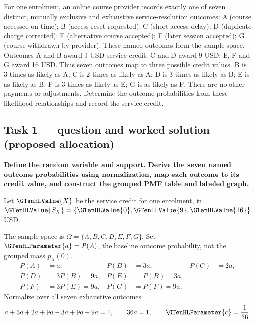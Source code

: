 For one enrolment, an online course provider records exactly one of seven distinct, mutually exclusive and exhaustive service-resolution outcomes: A (course accessed on time); B (access reset requested); C (short access delay); D (duplicate charge corrected); E (alternative course accepted); F (later session accepted); G (course withdrawn by provider). These named outcomes form the sample space. Outcomes A and B award 0 USD service credit; C and D award 9 USD; E, F and G award 16 USD. Thus seven outcomes map to three possible credit values. B is 3 times as likely as A; C is 2 times as likely as A; D is 3 times as likely as B; E is as likely as B; F is 3 times as likely as E; G is as likely as F. There are no other payments or adjustments. Determine the outcome probabilities from these likelihood relationships and record the service credit.

\subsection*{Task 1 --- question and worked solution (proposed allocation) }
\label{sol:q5t1}

\noindent\textbf{\boldmath Define the random variable and support. Derive the seven named outcome probabilities using normalization, map each outcome to its credit value, and construct the grouped PMF table and labeled graph.}\par\nopagebreak

Let $\GTenHLValue{X}$ be the service credit for one enrolment, in . $\GTenHLValue{S_X}=\{\GTenHLValue{0},\GTenHLValue{9},\GTenHLValue{16}\}$ USD.

The sample space is $\Omega=\{A,B,C,D,E,F,G\}$. Set $\GTenHLParameter{a}=P(A)$, the baseline outcome probability, not the grouped mass $p_X(0)$.
\begin{align*}P(A)&=a,&P(B)&=3a,&P(C)&=2a,\\P(D)&=3P(B)=9a,&P(E)&=P(B)=3a,\\P(F)&=3P(E)=9a,&P(G)&=P(F)=9a.\end{align*}
Normalize over all seven exhaustive outcomes:
\[a+3a+2a+9a+3a+9a+9a=1,\qquad 36a=1,\qquad \GTenHLParameter{a}=\frac1{36}.\]

